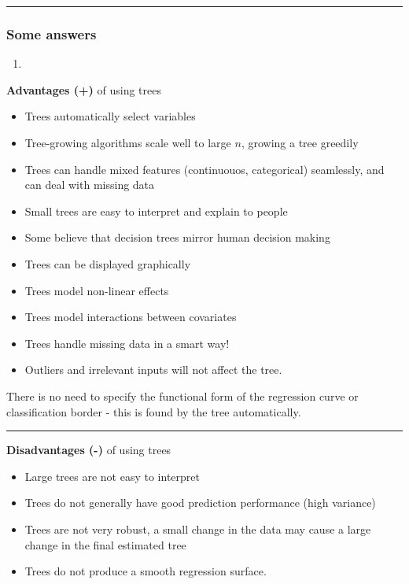 \documentclass[
  letterpaper,
  DIV=11,
  numbers=noendperiod]{scrartcl}
\providecommand{\tightlist}{%
  \setlength{\itemsep}{0pt}\setlength{\parskip}{0pt}}\usepackage{longtable,booktabs,array}
\begin{document}
\begin{center}\rule{0.5\linewidth}{0.5pt}\end{center}

\hypertarget{some-answers}{%
\subsubsection{Some answers}\label{some-answers}}

\begin{enumerate}
\def\labelenumi{\arabic{enumi})}
\setcounter{enumi}{4}
\tightlist
\item
\end{enumerate}

\textbf{Advantages (+)} of using trees

\begin{itemize}
\tightlist
\item
  Trees automatically select variables
\item
  Tree-growing algorithms scale well to large \(n\), growing a tree
  greedily
\item
  Trees can handle mixed features (continuouos, categorical) seamlessly,
  and can deal with missing data
\item
  Small trees are easy to interpret and explain to people
\item
  Some believe that decision trees mirror human decision making
\item
  Trees can be displayed graphically
\item
  Trees model non-linear effects
\item
  Trees model interactions between covariates
\item
  Trees handle missing data in a smart way!
\item
  Outliers and irrelevant inputs will not affect the tree.
\end{itemize}

There is no need to specify the functional form of the regression curve
or classification border - this is found by the tree automatically.

\begin{center}\rule{0.5\linewidth}{0.5pt}\end{center}

\textbf{Disadvantages (-)} of using trees

\begin{itemize}
\tightlist
\item
  Large trees are not easy to interpret
\item
  Trees do not generally have good prediction performance (high
  variance)
\item
  Trees are not very robust, a small change in the data may cause a
  large change in the final estimated tree
\item
  Trees do not produce a smooth regression surface.
\end{itemize}
\end{document}
